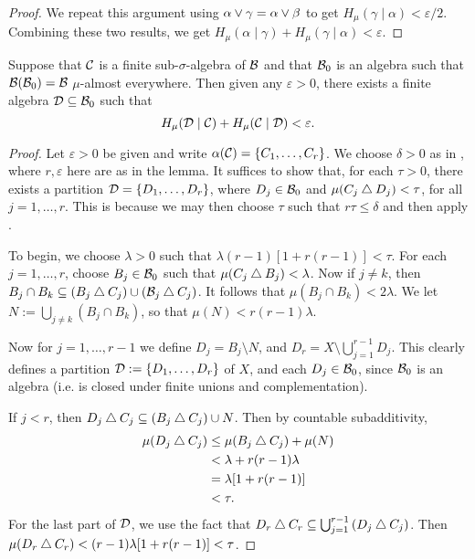 \begin{lemma}
\begin{proof}
		We repeat this argument using $\alpha \vee \gamma = \alpha \vee \beta$ to get $H_\mu(\gamma \mid \alpha) < \varepsilon / 2$. Combining these two results, we get $H_\mu(\alpha \mid \gamma) + H_\mu(\gamma \mid \alpha) < \varepsilon$.
	\end{proof}
\end{lemma}

\begin{theorem} \label{thm:walters-4-16}
	Suppose that $\mathcal{C}$ is a finite sub-$\sigma$-algebra of $\mathcal{B}$ and that $\mathcal{B}_0$ is an algebra such that $\mathcal{B}(\mathcal{B}_0) = \mathcal{B}$ $\mu$-almost everywhere. Then given any $\varepsilon > 0$, there exists a finite algebra $\mathcal{D} \subseteq \mathcal{B}_0$ such that
	\[
		H_\mu(\mathcal{D} \mid \mathcal{C}) + H_\mu(\mathcal{C} \mid \mathcal{D}) < \varepsilon.
	\]
	
	\begin{proof}
		Let $\varepsilon > 0$ be given and write $\alpha(\mathcal{C}) = \{C_1, \dots, C_r\}$. We choose $\delta > 0$ as in , where $r, \varepsilon$ here are as in the lemma. It suffices to show that, for each $\tau > 0$, there exists a partition $\mathcal{D} = \{D_1, \dots, D_r\}$, where $D_j \in \mathcal{B}_0$ and $\mu(C_j \bigtriangleup D_j) < \tau$, for all $j = 1, \dots, r$. This is because we may then choose $\tau$ such that $r\tau \leq \delta$ and then apply .
		
		To begin, we choose $\lambda > 0$ such that $\lambda(r - 1)[1 + r(r - 1)] < \tau$. For each $j = 1, \dots, r$, choose $B_j \in \mathcal{B}_0$ such that $\mu(C_j \bigtriangleup B_j) < \lambda$. Now if $j \neq k$, then $B_j \cap B_k \subseteq (B_j \bigtriangleup C_j) \cup (\mathcal{B}_j \bigtriangleup C_j)$. It follows that $\mu(B_j \cap B_k) < 2\lambda$. We let $N := \bigcup_{j \neq k}{(B_j \cap B_k)}$, so that $\mu(N) < r(r - 1)\lambda$.
		
		Now for $j = 1, \dots, r - 1$ we define $D_j = B_j \setminus N$, and $D_r = X \setminus \bigcup_{j = 1}^{r - 1}{D_j}$. This clearly defines a partition $\mathcal{D} := \{D_1, \dots, D_r\}$ of $X$, and each $D_j \in \mathcal{B}_0$, since $\mathcal{B}_0$ is an algebra (i.e. is closed under finite unions and complementation).
		
		If $j < r$, then $D_j \bigtriangleup C_j \subseteq (B_j \bigtriangleup C_j) \cup N$. Then by countable subadditivity,
		\begin{align*}
			\mu(D_j \bigtriangleup C_j) &\leq \mu(B_j \bigtriangleup C_j) + \mu(N) \\
				&< \lambda + r(r - 1)\lambda \\
				&= \lambda[1 + r(r - 1)] \\
				&< \tau.
		\end{align*}
		For the last part of $\mathcal{D}$, we use the fact that $D_r \bigtriangleup C_r \subseteq \bigcup_{j = 1}^{r - 1}{(D_j \bigtriangleup C_j)}$. Then $\mu(D_r \bigtriangleup C_r) < (r - 1)\lambda[1 + r(r - 1)] < \tau$.
	\end{proof}
\end{theorem}

